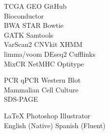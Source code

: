 \begin{minipage}[t]{0.33\textwidth}
TCGA \textbullet{} GEO \textbullet{} GitHub \\
Bioconductor \\

BWA \textbullet{} STAR \textbullet{} Bowtie \\

GATK \textbullet{} Samtools \\
VarScan2 \textbullet{} CNVkit \textbullet{} XHMM \\

limma/voom \textbullet{} DEseq2 \textbullet{} Cufflinks \\

MixCR\textbullet{} NetMHC \textbullet{} Optitype \\
\sectionspace %

PCR \textbullet{} qPCR \textbullet{} Western Blot \\
Mammalian Cell Culture \\
SDS-PAGE \\
\sectionspace %

\LaTeX \textbullet{} Photoshop \textbullet{} Illustrator\\
English (Native) \textbullet{} Spanish (Fluent)

\sectionspace %

\end{minipage} %
\hfill
%
%
